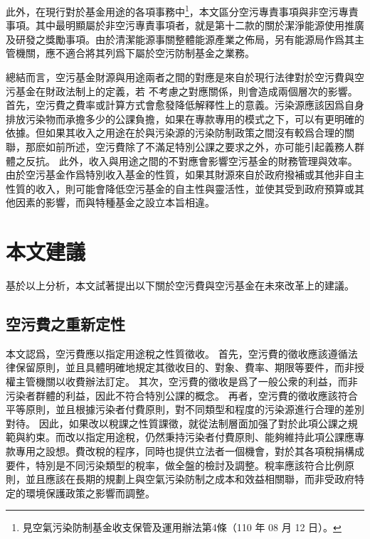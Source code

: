 \documentclass[12pt,a4paper]{article}
\begin{document}
此外，在現行對於基金用途的各項事務中\footnote{見空氣污染防制基金收支保管及運用辦法第4條（110 年 08 月 12 日）。}，本文區分空污專責事項與非空污專責事項。其中最明顯屬於非空污專責事項者，就是第十二款的關於潔淨能源使用推廣及研發之獎勵事項。由於清潔能源事關整體能源產業之佈局，另有能源局作爲其主管機關，應不適合將其列爲下屬於空污防制基金之業務。


總結而言，空污基金財源與用途兩者之間的對應是來自於現行法律對於空污費與空污基金在財政法制上的定義，若
不考慮之對應關係，則會造成兩個層次的影響。首先，空污費之費率或計算方式會愈發降低解釋性上的意義。污染源應該因爲自身排放污染物而承擔多少的公課負擔，如果在專款專用的模式之下，可以有更明確的依據。但如果其收入之用途在於與污染源的污染防制政策之間沒有較爲合理的關聯，那麽如前所述，空污費除了不滿足特別公課之要求之外，亦可能引起義務人群體之反抗。
此外，收入與用途之間的不對應會影響空污基金的財務管理與效率。由於空污基金作爲特別收入基金的性質，如果其財源來自於政府撥補或其他非自主性質的收入，則可能會降低空污基金的自主性與靈活性，並使其受到政府預算或其他因素的影響，而與特種基金之設立本旨相違。


\section{本文建議}

基於以上分析，本文試著提出以下關於空污費與空污基金在未來改革上的建議。

\subsection{空污費之重新定性}

本文認爲，空污費應以指定用途稅之性質徵收。
首先，空污費的徵收應該遵循法律保留原則，並且具體明確地規定其徵收目的、對象、費率、期限等要件，而非授權主管機關以收費辦法訂定。
其次，空污費的徵收是爲了一般公衆的利益，而非污染者群體的利益，因此不符合特別公課的概念。
再者，空污費的徵收應該符合平等原則，並且根據污染者付費原則，對不同類型和程度的污染源進行合理的差別對待。
因此，如果改以稅課之性質課徵，就從法制層面加强了對於此項公課之規範與約束。而改以指定用途稅，仍然秉持污染者付費原則、能夠維持此項公課應專款專用之設想。費改稅的程序，同時也提供立法者一個機會，對於其各項稅捐構成要件，特別是不同污染類型的稅率，做全盤的檢討及調整。稅率應該符合比例原則，並且應該在長期的規劃上與空氣污染防制之成本和效益相關聯，而非受政府特定的環境保護政策之影響而調整。
\end{document}

